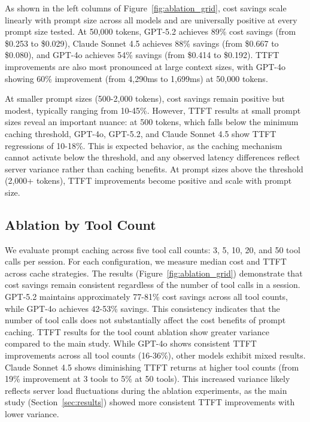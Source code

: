 \documentclass{article}
\theoremstyle{plain}
\theoremstyle{definition}
\theoremstyle{remark}
\begin{document}
As shown in the left columns of Figure~\ref{fig:ablation_grid}, cost savings scale linearly with prompt size across all models and are universally positive at every prompt size tested. At 50,000 tokens, GPT-5.2 achieves 89\% cost savings (from \$0.253 to \$0.029), Claude Sonnet 4.5 achieves 88\% savings (from \$0.667 to \$0.080), and GPT-4o achieves 54\% savings (from \$0.414 to \$0.192). TTFT improvements are also most pronounced at large context sizes, with GPT-4o showing 60\% improvement (from 4,290ms to 1,699ms) at 50,000 tokens.

At smaller prompt sizes (500-2,000 tokens), cost savings remain positive but modest, typically ranging from 10-45\%. However, TTFT results at small prompt sizes reveal an important nuance: at 500 tokens, which falls below the minimum caching threshold, GPT-4o, GPT-5.2, and Claude Sonnet 4.5 show TTFT regressions of 10-18\%. This is expected behavior, as the caching mechanism cannot activate below the threshold, and any observed latency differences reflect server variance rather than caching benefits. At prompt sizes above the threshold (2,000+ tokens), TTFT improvements become positive and scale with prompt size.

\subsection{Ablation by Tool Count}
\label{subsec:ablation_tool_count}

We evaluate prompt caching across five tool call counts: 3, 5, 10, 20, and 50 tool calls per session. For each configuration, we measure median cost and TTFT across cache strategies. The results (Figure~\ref{fig:ablation_grid}) demonstrate that cost savings remain consistent regardless of the number of tool calls in a session. GPT-5.2 maintains approximately 77-81\% cost savings across all tool counts, while GPT-4o achieves 42-53\% savings. This consistency indicates that the number of tool calls does not substantially affect the cost benefits of prompt caching. TTFT results for the tool count ablation show greater variance compared to the main study. While GPT-4o shows consistent TTFT improvements across all tool counts (16-36\%), other models exhibit mixed results. Claude Sonnet 4.5 shows diminishing TTFT returns at higher tool counts (from 19\% improvement at 3 tools to 5\% at 50 tools). This increased variance likely reflects server load fluctuations during the ablation experiments, as the main study (Section~\ref{sec:results}) showed more consistent TTFT improvements with lower variance.
\end{document}
